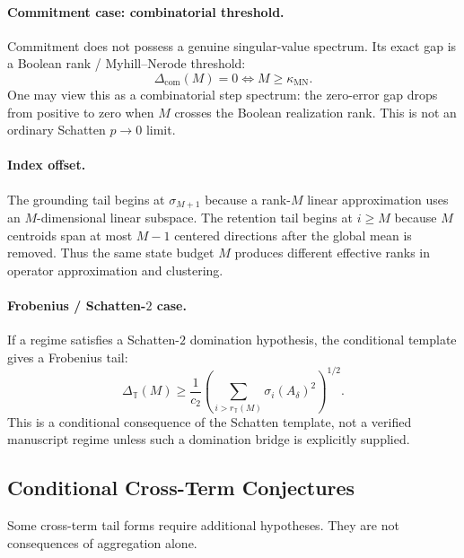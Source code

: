 \documentclass[12pt]{article}
\theoremstyle{definition}
\newcommand{\Com}{\Delta_{\mathrm{com}}}
\newcommand{\kappaMN}{\kappa_{\mathrm{MN}}}
\begin{document}
\paragraph{Commitment case: combinatorial threshold.}
Commitment does not possess a genuine singular-value spectrum.  Its exact gap
is a Boolean rank / Myhill--Nerode threshold:
\[
\Com(M)=0
\iff
M\ge\kappaMN.
\]
One may view this as a combinatorial step spectrum: the zero-error gap drops
from positive to zero when $M$ crosses the Boolean realization rank.  This is
not an ordinary Schatten $p\to0$ limit.

\paragraph{Index offset.}
The grounding tail begins at $\sigma_{M+1}$ because a rank-$M$ linear
approximation uses an $M$-dimensional linear subspace.  The retention tail
begins at $i\ge M$ because $M$ centroids span at most $M-1$ centered
directions after the global mean is removed.  Thus the same state budget $M$
produces different effective ranks in operator approximation and clustering.

\paragraph{Frobenius / Schatten-$2$ case.}
If a regime satisfies a Schatten-$2$ domination hypothesis, the conditional
template gives a Frobenius tail:
\[
\Delta_{\mathbb T}(M)
\ge
\frac1{c_2}
\left(
\sum_{i>r_{\mathbb T}(M)}
\sigma_i(A_\delta)^2
\right)^{1/2}.
\]
This is a conditional consequence of the Schatten template, not a verified
manuscript regime unless such a domination bridge is explicitly supplied.

\subsection{Conditional Cross-Term Conjectures}
\label{subsec:spectral-conjectures}

Some cross-term tail forms require additional hypotheses.  They are not
consequences of aggregation alone.
\end{document}
